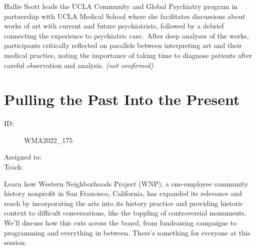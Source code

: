 \documentclass{report}
\begin{document}
                

                Hallie Scott leads the UCLA Community and Global Psychiatry program in partnership with UCLA Medical School where she facilitates discussions about works of art with current and future psychiatrists, followed by a debrief connecting the experience to psychiatric care. After deep analyses of the works, participants critically reflected on parallels between interpreting art and their medical practice, noting the importance of taking time to diagnose patients after careful observation and analysis.
                \emph{ (not confirmed) }
              
        
          \newpage
          \section{ Pulling the Past Into the Present }
            \begin{description}
              \item [ID:]
              WMA2022\_175

              \item [Assigned to:]
                \item [Track:]
              \end{description}

              Learn how Western Neighborhoods Project (WNP), a one-employee community history nonprofit in San Francisco, California, has expanded its relevance and reach by incorporating the arts into its history practice and providing historic context to difficult conversations, like the toppling of controversial monuments. We’ll discuss how this cuts across the board, from fundraising campaigns to programming and everything in between. There’s something for everyone at this session.
\end{document}
